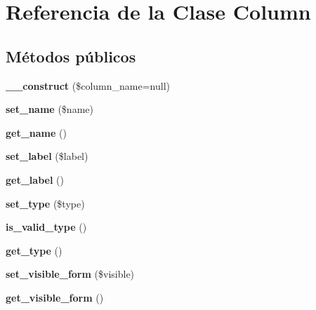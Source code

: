 \hypertarget{class_column}{}\section{Referencia de la Clase Column}
\label{class_column}
\subsection*{Métodos públicos}
\begin{DoxyCompactItemize}
\item 
\mbox{\label{class_column_a85261de17287659e7bde7e1710fc5916}} 
{\bfseries \+\_\+\+\_\+construct} (\$column\+\_\+name=null)
\item 
\mbox{\label{class_column_adb76436490cc4941cfd8ded9336f3321}} 
{\bfseries set\+\_\+name} (\$name)
\item 
\mbox{\label{class_column_adb3148efdbf2d710ae3d6617ce16781c}} 
{\bfseries get\+\_\+name} ()
\item 
\mbox{\label{class_column_ac17cbac2309c3ab456b818d7be33b2e7}} 
{\bfseries set\+\_\+label} (\$label)
\item 
\mbox{\label{class_column_a119d1743c608b0872a5df560b084ae36}} 
{\bfseries get\+\_\+label} ()
\item 
\mbox{\label{class_column_a7500d02a0114cde3ddb200143d39a2a0}} 
{\bfseries set\+\_\+type} (\$type)
\item 
\mbox{\label{class_column_a585cfab5cbfb826d564eeecd7fc462a7}} 
{\bfseries is\+\_\+valid\+\_\+type} ()
\item 
\mbox{\label{class_column_ae0f1d35fdaae4ba874bba1f0a4db051b}} 
{\bfseries get\+\_\+type} ()
\item 
\mbox{\label{class_column_a66009bdbc227c7cc6764f31152270e08}} 
{\bfseries set\+\_\+visible\+\_\+form} (\$visible)
\item 
\mbox{\label{class_column_a58959194643294bb27c06cf13584f79a}} 
{\bfseries get\+\_\+visible\+\_\+form} ()

\end{DoxyCompactItemize}
